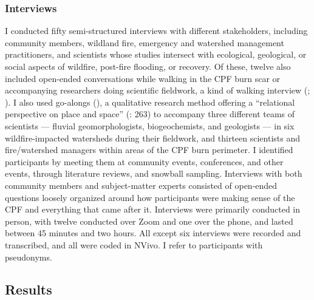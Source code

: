 \documentclass[
]{article}
\begin{document}
\subsubsection{Interviews}\label{interviews-1}

I conducted fifty semi-structured interviews with different stakeholders, including community members, wildland fire, emergency and watershed management practitioners, and scientists whose studies intersect with ecological, geological, or social aspects of wildfire, post-fire flooding, or recovery. Of these, twelve also included open-ended conversations while walking in the CPF burn scar or accompanying researchers doing scientific fieldwork, a kind of walking interview (; ). I also used go-alongs (), a qualitative research method offering a ``relational perspective on place and space'' (: 263) to accompany three different teams of scientists --- fluvial geomorphologists, biogeochemists, and geologists --- in six wildfire-impacted watersheds during their fieldwork, and thirteen scientists and fire/watershed managers within areas of the CPF burn perimeter. I identified participants by meeting them at community events, conferences, and other events, through literature reviews, and snowball sampling. Interviews with both community members and subject-matter experts consisted of open-ended questions loosely organized around how participants were making sense of the CPF and everything that came after it. Interviews were primarily conducted in person, with twelve conducted over Zoom and one over the phone, and lasted between 45 minutes and two hours. All except six interviews were recorded and transcribed, and all were coded in NVivo. I refer to participants with pseudonyms.

\subsection{Results}\label{results}
\end{document}
